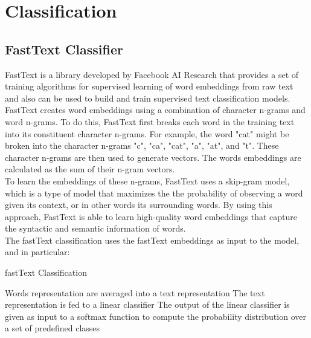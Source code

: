 \section{Classification}


\subsection{FastText Classifier}
FastText is a library developed by Facebook AI Research that provides a set of training algorithms for supervised learning of word embeddings from raw text and also can be used to build and train supervised text classification models. \\
FastText creates word embeddings using a combination of character n-grams and word n-grams. To do this, FastText first breaks each word in the training text into its constituent character n-grams. For example, the word "cat" might be broken into the character n-grams "c", "ca", "cat", "a", "at", and "t". These character n-grams are then used to generate vectors. The words embeddings are calculated as the sum of their n-gram vectors. \\
To learn the embeddings of these n-grams, FastText uses a skip-gram model, which is a type of model that maximizes the the probability of observing a word given its context, or in other words its surrounding words. By using this approach, FastText is able to learn high-quality word embeddings that capture the syntactic and semantic information of words. \\
The fastText classification uses the fastText embeddings as input to the model, and in particular:
\begin{algorithm}
    \caption*{fastText Classification}
    \begin{algorithmic}[1]
      \State Words representation are averaged into a text representation
      \State The text representation is fed to a linear classifier
      \State The output of the linear classifier is given as input to a softmax function to compute the probability distribution over a set of predefined classes
    \end{algorithmic}
\end{algorithm}


